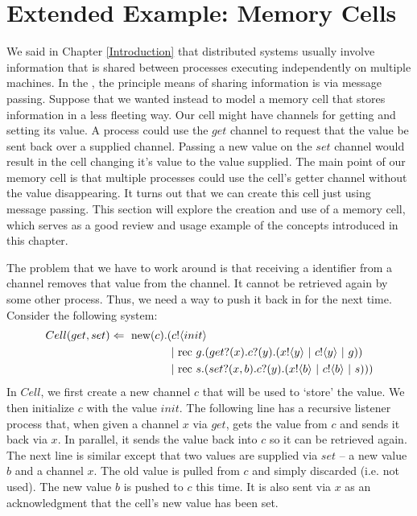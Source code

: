 \section{Extended Example: Memory Cells}\label{secmemcells}
	We said in Chapter \ref{Introduction} that distributed systems usually involve information that is shared between processes executing independently on multiple machines.  
In the \picalc, the principle means of sharing information is via message passing.  
Suppose that we wanted instead to model a memory cell that stores information in a less fleeting way.  
Our cell might have channels for getting and setting its value.
A process could use the $get$ channel to request that the value be sent back over a supplied channel.
Passing a new value on the $set$ channel would result in the cell changing it's value to the value supplied.
The main point of our memory cell is that multiple processes could use the cell's getter channel without the value disappearing.
It turns out that we can create this cell just using message passing.  
This section will explore the creation and use of a memory cell, which serves as a good review and usage example of the concepts introduced in this chapter.

	The problem that we have to work around is that receiving a identifier from a channel removes that value from the channel.  
It cannot be retrieved again by some other process.  
Thus, we need a way to push it back in for the next time.  
Consider the following system:
	\begin{equation}\begin{split}
		Cell(get,set) \Leftarrow\  \text{new}({c}). & ({c}!\langle{init}\rangle \\
		& \ |\ \text{rec }{g}.({get}?({x}).{c}?({y}).({x}!\langle{y}\rangle\ |\  {c}!\langle{y}\rangle\ |\  g))\\
		&\ |\ \text{rec }{s}.({set}?({x,b}).{c}?({y}).({x}!\langle{b}\rangle\ |\ {c}!\langle{b}\rangle\ |\  s)))
	\end{split}\end{equation}
	In $Cell$, we first create a new channel $c$ that will be used to `store' the value.  
We then initialize $c$ with the value $init$.  
The following line has a recursive listener process that, when given a channel $x$ via $get$, gets the value from $c$ and sends it back via $x$.  
In parallel, it sends the value back into $c$ so it can be retrieved again.  
The next line is similar except that two values are supplied via $set$ -- a new value $b$ and a channel $x$.  
The old value is pulled from $c$ and simply discarded (i.e. not used).  
The new value $b$ is pushed to $c$ this time.  
It is also sent via $x$ as an acknowledgment that the cell's new value has been set.
	 

